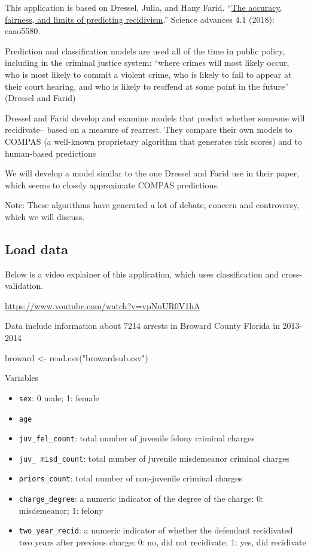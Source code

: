 \documentclass[
  letterpaper,
  DIV=11,
  numbers=noendperiod]{scrreprt}
\newenvironment{Shaded}{\begin{snugshade}}{\end{snugshade}}
\newcommand{\FunctionTok}[1]{\textcolor[rgb]{0.28,0.35,0.67}{#1}}
\newcommand{\NormalTok}[1]{\textcolor[rgb]{0.00,0.23,0.31}{#1}}
\newcommand{\OtherTok}[1]{\textcolor[rgb]{0.00,0.23,0.31}{#1}}
\newcommand{\StringTok}[1]{\textcolor[rgb]{0.13,0.47,0.30}{#1}}
\providecommand{\tightlist}{%
  \setlength{\itemsep}{0pt}\setlength{\parskip}{0pt}}\usepackage{longtable,booktabs,array}
\begin{document}
This application is based on Dressel, Julia, and Hany Farid.
``\href{https://www.science.org/doi/10.1126/sciadv.aao5580}{The
accuracy, fairness, and limits of predicting recidivism}.'' Science
advances 4.1 (2018): eaao5580.

Prediction and classification models are used all of the time in public
policy, including in the criminal justice system: ``where crimes will
most likely occur, who is most likely to commit a violent crime, who is
likely to fail to appear at their court hearing, and who is likely to
reoffend at some point in the future'' (Dressel and Farid)

Dressel and Farid develop and examine models that predict whether
someone will recidivate-- based on a measure of rearrest. They compare
their own models to COMPAS (a well-known proprietary algorithm that
generates risk scores) and to human-based predictions

We will develop a model similar to the one Dressel and Farid use in
their paper, which seems to closely approximate COMPAS predictions.

Note: These algorithms have generated a lot of debate, concern and
controversy, which we will discuss.

\hypertarget{load-data}{%
\subsection{Load data}\label{load-data}}

Below is a video explainer of this application, which uses
classification and cross-validation.

\url{https://www.youtube.com/watch?v=vpNnUR0V1hA}

Data include information about 7214 arrests in Broward County Florida in
2013-2014

\begin{Shaded}
\begin{Highlighting}[]
\NormalTok{broward }\OtherTok{\textless{}{-}} \FunctionTok{read.csv}\NormalTok{(}\StringTok{"browardsub.csv"}\NormalTok{)}
\end{Highlighting}
\end{Shaded}

Variables

\begin{itemize}
\tightlist
\item
  \texttt{sex}: 0 male; 1: female
\item
  \texttt{age}
\item
  \texttt{juv\_fel\_count}: total number of juvenile felony criminal
  charges
\item
  \texttt{juv\_\ misd\_count}: total number of juvenile misdemeanor
  criminal charges
\item
  \texttt{priors\_count}: total number of non-juvenile criminal charges
\item
  \texttt{charge\_degree}: a numeric indicator of the degree of the
  charge: 0: misdemeanor; 1: felony
\item
  \texttt{two\_year\_recid}: a numeric indicator of whether the
  defendant recidivated two years after previous charge: 0: no, did not
  recidivate; 1: yes, did recidivate
\end{itemize}
\end{document}
